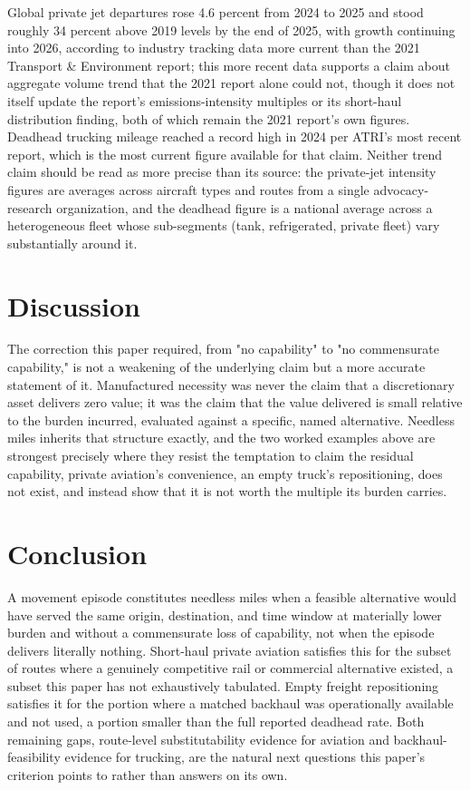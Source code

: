 \documentclass[11pt]{article}
\begin{document}
Global private jet departures rose 4.6 percent from 2024 to 2025 and stood roughly 34 percent above 2019 levels by the end of 2025, with growth continuing into 2026, according to industry tracking data more current than the 2021 Transport \& Environment report; this more recent data supports a claim about aggregate volume trend that the 2021 report alone could not, though it does not itself update the report's emissions-intensity multiples or its short-haul distribution finding, both of which remain the 2021 report's own figures. Deadhead trucking mileage reached a record high in 2024 per ATRI's most recent report, which is the most current figure available for that claim. Neither trend claim should be read as more precise than its source: the private-jet intensity figures are averages across aircraft types and routes from a single advocacy-research organization, and the deadhead figure is a national average across a heterogeneous fleet whose sub-segments (tank, refrigerated, private fleet) vary substantially around it.

\section{Discussion}

The correction this paper required, from "no capability" to "no commensurate capability," is not a weakening of the underlying claim but a more accurate statement of it. Manufactured necessity was never the claim that a discretionary asset delivers zero value; it was the claim that the value delivered is small relative to the burden incurred, evaluated against a specific, named alternative. Needless miles inherits that structure exactly, and the two worked examples above are strongest precisely where they resist the temptation to claim the residual capability, private aviation's convenience, an empty truck's repositioning, does not exist, and instead show that it is not worth the multiple its burden carries.

\section{Conclusion}

A movement episode constitutes needless miles when a feasible alternative would have served the same origin, destination, and time window at materially lower burden and without a commensurate loss of capability, not when the episode delivers literally nothing. Short-haul private aviation satisfies this for the subset of routes where a genuinely competitive rail or commercial alternative existed, a subset this paper has not exhaustively tabulated. Empty freight repositioning satisfies it for the portion where a matched backhaul was operationally available and not used, a portion smaller than the full reported deadhead rate. Both remaining gaps, route-level substitutability evidence for aviation and backhaul-feasibility evidence for trucking, are the natural next questions this paper's criterion points to rather than answers on its own.
\end{document}
